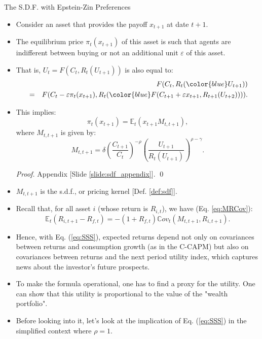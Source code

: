 \begin{frame}{The S.D.F. with Epstein-Zin Preferences}
\begin{footnotesize}
\begin{itemize}
	\item Consider an asset that provides the payoff $x_{t+1}$ at date $t+1$.
	\item The equilibrium price $\pi_t(x_{t+1})$ of this asset is such that agents are indifferent between buying or not an additional unit $\varepsilon$ of this asset.
	\item That is, $U_t = F(C_t,R_t(U_{t+1}))$ is also equal to:
	\begin{eqnarray}\label{eq:SDFV}
	&&  F(C_t,R_t({\color{blue}U_{t+1}})) \nonumber \\
	&=&F(C_t-\varepsilon \pi_t(x_{t+1}),R_t({\color{blue}F(C_{t+1}+\varepsilon x_{t+1},R_{t+1}(U_{t+2}))})).
	\end{eqnarray}
	\item This implies:
	$$
	\pi_t(x_{t+1}) = \mathbb{E}_t \left( x_{t+1} M_{t,t+1} \right),
	$$
	where $M_{t,t+1}$ is given by:
	\begin{equation}\label{eq:SSS}
	M_{t,t+1}= \delta \left(\frac{C_{t+1}}{C_t}\right)^{-\rho}  \left(\frac{U_{t+1}}{R_{t}(U_{t+1})}\right)^{\rho-\gamma}.
	\end{equation}
	\begin{tiny}
	\begin{proof} Appendix [Slide \ref{slide:sdf_appendix}]. \qed
	\end{proof}
	\end{tiny}
	\item $M_{t,t+1}$ is the s.d.f., or pricing kernel [Def. \ref{def:sdf}].
\end{itemize}
\end{footnotesize}
\end{frame}

\begin{frame}{}
\begin{footnotesize}
\begin{itemize}
	\item Recall that, for all asset $i$ (whose return is $R_{i,t}$), we have (Eq. \ref{eq:MRCov}):
	$$
	\mathbb{E}_t(R_{i,t+1} - R_{f,t}) = - (1 + R_{f,t}) \mathbb{C}ov_t(M_{t,t+1},R_{i,t+1}).
	$$
	\item Hence, with Eq. (\ref{eq:SSS}), expected returns depend not only on covariances between returns and consumption growth (as in the C-CAPM) but also on covariances between returns and the next period utility index, which captures news about the investor's future prospects.
	\item To make the formula operational, one has to find a proxy for the utility. One can show that this utility is proportional to the value of the "{\color{blue}wealth portfolio}".
	\item Before looking into it, let's look at the implication of Eq. (\ref{eq:SSS}) in the simplified context where $\rho = 1$.
\end{itemize}
\end{footnotesize}
\end{frame}



